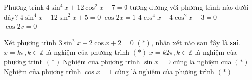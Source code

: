 



\begin{ex}%
 Phương trình $4\sin^4x+12\cos^2x-7=0$ tương đương với phương trình nào dưới  đây?
 \choiceTF 
  {\True  $4\sin^4x-12\sin^2x+5=0$}
   {$\cos2x=1$}
  {$4\cos^4x-4\cos^2x-3=0$} 
  {\True  $\cos2x=0$}
\end{ex}

\begin{ex}%
 Xét phương trình $3\sin^2x-2\cos x+2=0$ $(*)$, nhận xét  nào sau đây là \textbf{sai}.
 \choiceTF 
  {\True $x=k\pi,k\in\mathbb{Z}$ là  nghiệm của phương trình $(*)$}
  {$x=k2\pi,k\in\mathbb{Z}$ là nghiệm của  phương trình $(*)$}
   {\True Nghiệm của phương trình $\sin x=0$ cũng là nghiệm của $(*)$}
  {Nghiệm của phương trình $\cos x=1$ cũng là  nghiệm của phương trình $(*)$}
\end{ex}

